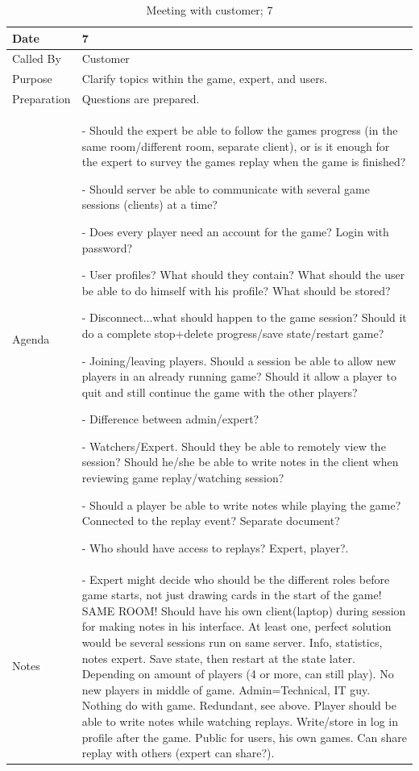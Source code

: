 {\footnotesize
\begin{table}[H]
\begin{tabular}{| p{5cm} | p{10cm} |}\hline
	\textbf{Date}	& \textbf{7} \\ \hline
	Called	By		& Customer\\ \hline
	Purpose		& Clarify topics within the game, expert, and users.\\ \hline
	Preparation 
		&  Questions are prepared. \\ 
		
	Agenda
		& - Should the expert be able to follow the games progress (in the same room/different room, separate client), or is it enough for the expert to survey the games replay when the game is finished?
	
- Should server be able to communicate with several game sessions (clients) at a time?
	
- Does every player need an account for the game? Login with password?
	
- User profiles? What should they contain? What should the user be able to do himself with his profile? What should be stored?
	
- Disconnect...what should happen to the game session? Should it do a complete stop+delete progress/save state/restart game?
	
- Joining/leaving players. Should a session be able to allow new players in an already running game? Should it allow a player to quit and still continue the game with the other players?
	
- Difference between admin/expert?
		
- Watchers/Expert. Should they be able to remotely view the session? Should he/she be able to write notes in the client when reviewing game replay/watching session?
	
- Should a player be able to write notes while playing the game? Connected to the replay event? Separate document?
		
- Who should have access to replays? Expert, player?.  \\

	Notes	& - 	Expert might decide who should be the different roles before game starts, not just drawing cards in the start of the game!
	SAME ROOM! Should have his own client(laptop) during session for making notes in his interface.
	At least one, perfect solution would be several sessions run on same server.
	Info, statistics, notes expert.
	Save state, then restart at the state later.
	Depending on amount of players (4 or more, can still play). No new players in middle of game.
	Admin=Technical, IT guy. Nothing do with game.
	Redundant, see above. Player should be able to write notes while watching replays.
	Write/store in log in profile after the game.
	Public for users, his own games. Can share replay with others (expert can share?).\\ \hline
	
\end{tabular}

\caption{Meeting with customer; 7}
\label{fig:meeting_7}
\end{table}}


